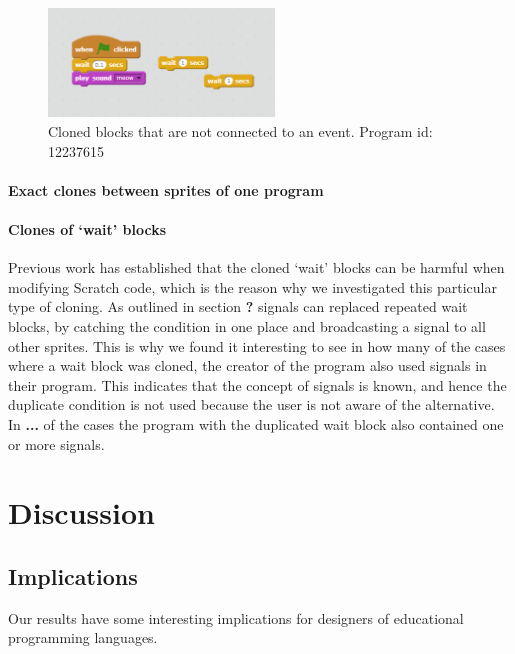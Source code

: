 \documentclass{sig-alternate}
\newcommand{\todo}[1]{\textbf{#1}}
\begin{document}
\begin{figure}
	\begin{center}
		\includegraphics[width=6cm]{fig/Unconnected_clones.png}
		\caption{Cloned blocks that are not connected to an event. Program id: 12237615}
		\label{fig:Unconnected_clones}
	\end{center}
\end{figure} 


\paragraph{Exact clones between sprites of one program}

\paragraph{Clones of `wait' blocks}
Previous work has established that the cloned `wait' blocks can be harmful when modifying Scratch code, which is the reason why we investigated this particular type of cloning. As outlined in section \todo{?} signals can replaced repeated wait blocks, by catching the condition in one place and broadcasting a signal to all other sprites. This is why we found it interesting to see in how many of the cases where a wait block was cloned, the creator of the program also used signals in their program. This indicates that the concept of signals is known, and hence the duplicate condition is not used because the user is not aware of the alternative. In \todo{...} of the cases the program with the duplicated wait block also contained one or more signals. 



\section{Discussion}

\subsection{Implications}
Our results have some interesting implications for designers of educational programming languages. 
\end{document}
